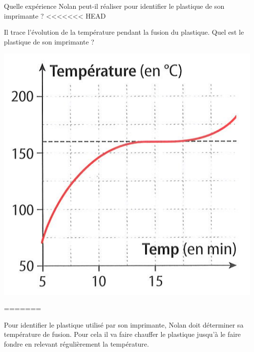 \begin{questions}
	\question[2] Quelle expérience Nolan peut-il réaliser pour identifier le plastique de son imprimante ?
<<<<<<< HEAD
	
	\question[2] Il trace l'évolution de la température pendant la fusion du plastique. Quel est le plastique de son imprimante ?
	
	\begin{center}
		\includegraphics[scale=0.6]{img/courbe2}
	\end{center}
=======
		\begin{solution}
			Pour identifier le plastique utilisé par son imprimante, Nolan doit déterminer sa température de fusion. Pour cela il va faire chauffer le plastique jusqu'à le faire fondre en relevant régulièrement la température.
		\end{solution}
	

\end{questions}
